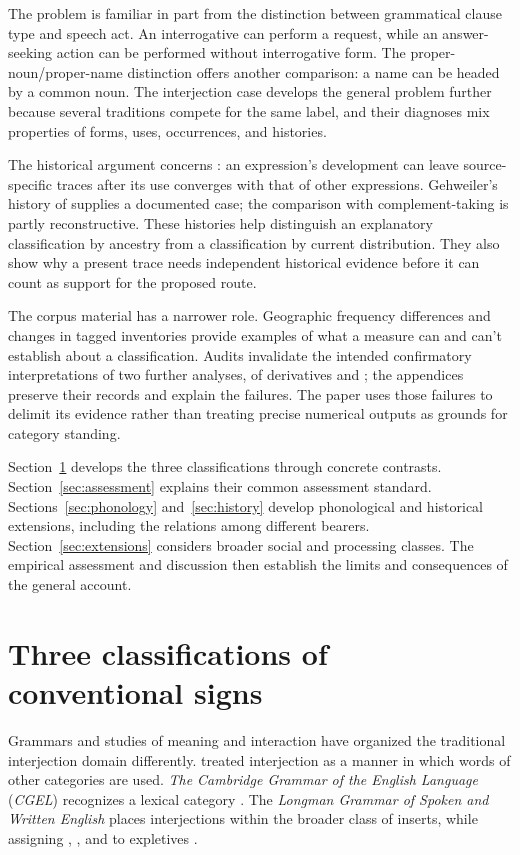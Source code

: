 \documentclass[12pt]{article}
\begin{document}
The problem is familiar in part from the distinction between grammatical
clause type and speech act. An interrogative can perform a request, while
an answer-seeking action can be performed without interrogative form. The
proper-noun/proper-name distinction offers another comparison: a name can
be headed by a common noun. The interjection case develops the general
problem further because several traditions compete for the same label,
and their diagnoses mix properties of forms, uses, occurrences, and histories.

The historical argument concerns : an expression's
development can leave source-specific traces after its use converges with
that of other expressions. Gehweiler's history of  supplies a
documented case; the comparison with complement-taking  is
partly reconstructive. These histories help distinguish an explanatory
classification by ancestry from a classification by current distribution.
They also show why a present trace needs independent historical evidence
before it can count as support for the proposed route.

The corpus material has a narrower role. Geographic frequency differences
and changes in tagged inventories provide examples of what a measure can
and can't establish about a classification. Audits invalidate the intended
confirmatory interpretations of two further analyses, of derivatives and
; the appendices preserve their records and explain the failures.
The paper uses those failures to delimit its evidence rather than treating
precise numerical outputs as grounds for category standing.

Section~\ref{sec:worked} develops the three classifications through concrete
contrasts. Section~\ref{sec:assessment} explains their common assessment
standard. Sections~\ref{sec:phonology} and~\ref{sec:history} develop phonological
and historical extensions, including the relations among different bearers.
Section~\ref{sec:extensions} considers broader social and processing classes.
The empirical assessment and discussion then establish the limits and
consequences of the general account.

\section{Three classifications of conventional signs}\label{sec:worked}

Grammars and studies of meaning and interaction have organized the traditional
interjection domain differently. \textcite[90]{jespersen1924} treated interjection as a manner
in which words of other categories are used.
\textit{The Cambridge Grammar of the English Language} (\textit{CGEL})
recognizes a lexical category \citep[22]{HuddlestonPullum2002}. The
\textit{Longman Grammar of Spoken and Written English} places interjections
within the broader class of inserts, while assigning ,
, and  to expletives \citep[1082--1083, 1094--1095]{Biber1999}.
\end{document}
